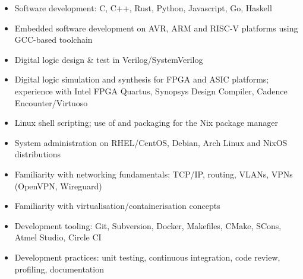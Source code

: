 
\vspace{-1.2em}

\begin{itemize}
  \item Software development: C, C++, Rust, Python, Javascript, Go, Haskell
  \item Embedded software development on AVR, ARM and RISC-V platforms using GCC-based toolchain
  \item Digital logic design \& test in Verilog/SystemVerilog
  \item Digital logic simulation and synthesis for FPGA and ASIC platforms; experience with Intel FPGA Quartus, Synopsys Design Compiler, Cadence Encounter/Virtuoso
  \item Linux shell scripting; use of and packaging for the Nix package manager
  \item System administration on RHEL/CentOS, Debian, Arch Linux and NixOS distributions
  \item Familiarity with networking fundamentals: TCP/IP, routing, VLANs, VPNs (OpenVPN, Wireguard)
  \item Familiarity with virtualisation/containerisation concepts
  \item Development tooling: Git, Subversion, Docker, Makefiles, CMake, SCons, Atmel Studio, Circle CI
  \item Development practices: unit testing, continuous integration, code review, profiling, documentation
\end{itemize}

